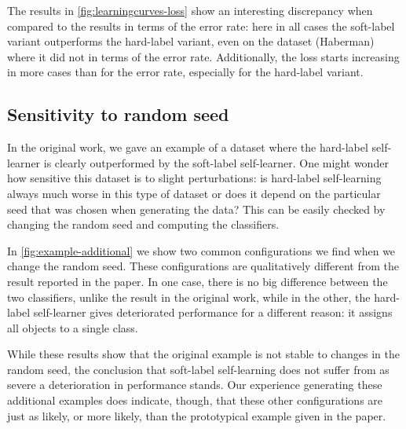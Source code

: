 \documentclass[runningheads,a4paper]{llncs}\usepackage[]{graphicx}\usepackage[]{color}
\begin{document}
The results in \cref{fig:learningcurves-loss} show an interesting discrepancy when compared to the results in terms of the error rate: here in all cases the soft-label variant outperforms the hard-label variant, even on the dataset (Haberman) where it did not in terms of the error rate. Additionally, the loss starts increasing in more cases than for the error rate, especially for the hard-label variant.

\subsection{Sensitivity to random seed}
In the original work, we gave an example of a dataset where the hard-label self-learner is clearly outperformed by the soft-label self-learner. One might wonder how sensitive this dataset is to slight perturbations: is hard-label self-learning always much worse in this type of dataset or does it depend on the particular seed that was chosen when generating the data? This can be easily checked by changing the random seed and computing the classifiers. 

In \cref{fig:example-additional} we show two common configurations we find when we change the random seed. These configurations are qualitatively different from the result reported in the paper. In one case, there is no big difference between the two classifiers, unlike the result in the original work, while in the other, the hard-label self-learner gives deteriorated performance for a different reason: it assigns all objects to a single class. 

While these results show that the original example is not stable to changes in the random seed, the conclusion that soft-label self-learning does not suffer from as severe a deterioration in performance stands. Our experience generating these additional examples does indicate, though, that these other configurations are just as likely, or more likely, than the prototypical example given in the paper.
\end{document}
